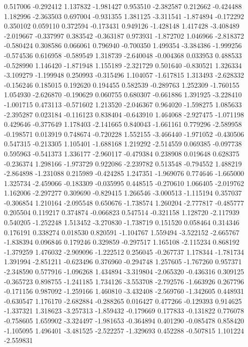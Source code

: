 0.517006
-0.292412
1.137832
-1.981427
0.953510
-2.382587
0.212662
-0.424488
1.182996
-2.363503
0.697004
-0.931355
1.381125
-3.311541
-1.874894
-0.172292
0.350102
0.059110
0.372594
-0.173431
0.949126
-1.428148
1.417428
-3.408489
-2.019667
-0.337997
0.383542
-0.363187
0.973931
-1.872702
1.046966
-2.818372
-0.580424
0.308586
0.066061
0.796940
-0.700350
1.499354
-3.384386
-1.999256
-0.574536
0.616958
-0.589549
1.318739
-2.640048
-0.004368
0.033953
0.488533
-0.528990
1.146420
-1.871948
1.155189
-2.321729
0.501640
-0.830521
1.326334
-3.109279
-1.199948
0.250993
-0.315496
1.104057
-1.617815
1.313493
-2.628332
-0.156246
0.185015
0.192620
0.194455
0.582539
-0.289763
1.252309
-1.760155
1.054930
-2.626870
-0.190629
0.060755
0.680307
-0.661886
1.391925
-3.228410
-1.001715
0.473113
-0.571602
1.213520
-2.046367
0.964020
-1.598275
1.085633
-2.395287
0.023184
-0.116123
0.838404
-0.643910
1.464068
-2.927475
-1.071198
0.429646
-0.377649
1.178403
-2.141665
0.840043
-1.661161
0.779296
-2.589958
-0.198571
0.013919
0.748674
-0.720228
1.552155
-3.466440
-1.971052
-0.430506
0.547315
-0.213305
1.105401
-1.688168
1.219292
-2.514559
0.069385
-0.097738
0.595963
-0.541373
1.336177
-2.960117
-0.479384
0.238908
0.019648
0.628375
-0.236374
1.298166
-1.973729
0.922086
-2.239782
0.513548
-0.794552
1.488219
-2.864898
-1.231088
0.215989
-0.424285
1.247351
-1.969076
0.774646
-1.665000
1.325734
-2.459066
-0.183309
-0.035995
0.448515
-0.270610
1.066405
-2.019762
1.162006
-2.297277
0.309690
-0.829415
1.266546
-3.000513
-1.115194
0.357037
-0.306854
1.210164
-2.095548
0.650676
-1.738574
1.260204
-2.777817
-0.485777
0.205504
0.119217
0.374874
-0.066823
0.547514
-0.321158
1.128720
-2.117939
0.540205
-1.252248
1.513452
-3.270830
-1.738719
0.151520
0.058464
0.314346
0.176191
0.338274
0.018530
0.820591
-1.104767
1.559494
-3.522152
-2.665767
-1.838394
0.096846
0.179246
0.329859
-0.297517
1.165108
-2.115234
0.868192
-1.379259
1.476032
-2.909096
-1.222512
0.256045
-0.267737
1.178344
-1.781734
1.391994
-2.851211
-0.623496
0.376960
-0.294748
1.257605
-1.767260
0.957371
-2.348590
0.577916
-1.096268
1.434894
-3.319804
-2.065320
-0.436316
0.309125
-0.365723
0.898755
-1.241185
1.734126
-3.553708
-2.792576
-1.663926
0.267796
-0.171156
0.987092
-1.259166
1.460810
-3.432408
-2.569760
-1.342605
0.448931
-0.630547
1.176170
-2.682884
-0.288265
0.016427
0.477266
-0.129393
0.914625
-1.337321
1.318623
-3.257313
-1.859432
-0.179669
0.177833
-0.131822
0.776078
-0.758605
1.659902
-3.324497
-1.981653
-0.364894
0.401290
-0.085478
0.858420
-1.105095
1.496401
-3.481525
-2.522257
-1.329693
0.452288
-0.507815
1.101224
-2.559831
